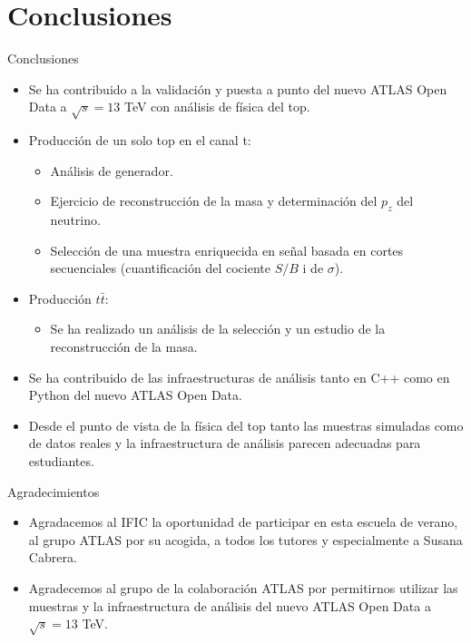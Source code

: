 \documentclass[10pt]{beamer}
\begin{document}
\section{Conclusiones}
\begin{frame}{Conclusiones}
\begin{itemize}
	\item Se ha contribuido a la validación y puesta a punto del nuevo ATLAS Open Data a $\sqrt{s}=13$ TeV con análisis de física del top.
	\item Producción de un solo top en el canal t:\begin{itemize}
	\item Análisis de generador.
	\item Ejercicio de reconstrucción de la masa y determinación del $p_z$ del neutrino.
	
	\item Selección de una muestra enriquecida en señal basada en cortes secuenciales (cuantificación del cociente $S/B$ i de $\sigma$). \end{itemize}
	\item Producción $t\bar{t}$:
	\begin{itemize}
		\item Se ha realizado un análisis de la selección y un estudio de la reconstrucción de la masa.
	\end{itemize}
\item Se ha contribuido de las infraestructuras de análisis tanto en C++ como en Python del nuevo ATLAS Open Data.
\item Desde el punto de vista de la física del top tanto las muestras simuladas como de datos reales y la infraestructura de análisis parecen adecuadas para estudiantes.
\end{itemize}
\end{frame}
\begin{frame}{Agradecimientos}
\begin{itemize}
\item	Agradacemos al IFIC la oportunidad de participar en esta escuela de verano, al grupo ATLAS por su acogida, a todos los tutores y especialmente a Susana Cabrera.
\item Agradecemos al grupo de la colaboración ATLAS por permitirnos utilizar las muestras y la infraestructura de análisis del nuevo ATLAS Open Data a $\sqrt{s}=13$ TeV.
\end{itemize}
\end{frame}
\end{document}
